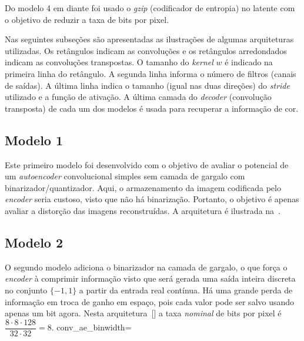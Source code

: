Do modelo 4 em diante foi usado o \textit{gzip} (codificador de entropia) no latente com o objetivo de reduzir a taxa de bits por pixel.

Nas seguintes subseções são apresentadas as ilustrações de algumas arquiteturas utilizadas. Os retângulos indicam as convoluções e os retângulos arredondados indicam as convoluções transpostas. O tamanho do \textit{kernel} $w$ é indicado na primeira linha do retângulo. A segunda linha informa o número de filtros (canais de saídas). A última linha indica o tamanho (igual nas duas direções) do \textit{stride} utilizado e a função de ativação. A última camada do \textit{decoder} (convolução transposta) de cada um dos modelos é usada para recuperar a informação de cor.
\subsection{Modelo 1}
\label{cap3:mod1}
Este primeiro modelo foi desenvolvido com o objetivo de avaliar o potencial de um \textit{autoencoder} convolucional simples sem camada de gargalo com binarizador/quantizador. Aqui, o armazenamento da imagem codificada pelo \textit{encoder} seria custoso, visto que não há binarização. Portanto, o objetivo é apenas avaliar a distorção das imagens reconstruídas. A arquitetura é ilustrada na~.
\subsection{Modelo 2}
\label{cap3:mod2}
O segundo modelo adiciona o binarizador na camada de gargalo, o que força o \textit{encoder} à comprimir informação visto que será gerada uma saída inteira discreta no conjunto $\{-1, 1\}$ a partir da entrada real contínua. Há uma grande perda de informação em troca de ganho em espaço, pois cada valor pode ser salvo usando apenas um bit agora. Nesta arquitetura~[] a taxa \emph{nominal} de bits por pixel é $\dfrac{8\cdot8\cdot128}{32\cdot32} = 8$. 
 {conv_ae_bin}{width=\textwidth}

